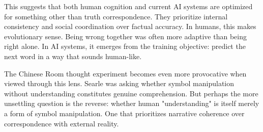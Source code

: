 \begin{commentary}
This suggests that both human cognition and current AI systems are optimized for something other than truth correspondence. They prioritize internal consistency and social coordination over factual accuracy. In humans, this makes evolutionary sense. Being wrong together was often more adaptive than being right alone. In AI systems, it emerges from the training objective: predict the next word in a way that sounds human-like.

The Chinese Room thought experiment becomes even more provocative when viewed through this lens. Searle was asking whether symbol manipulation without understanding constitutes genuine comprehension. But perhaps the more unsettling question is the reverse: whether human "understanding" is itself merely a form of symbol manipulation. One that prioritizes narrative coherence over correspondence with external reality.
\end{commentary}